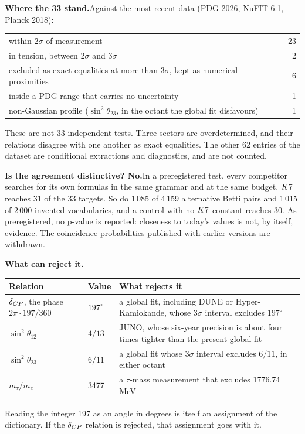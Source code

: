 \documentclass[10pt,a4paper]{article}
\begin{document}
{\noindent\textbf{Where the 33 stand.}\enspace Against the most recent
data (PDG 2026, NuFIT 6.1, Planck 2018):
\begin{center}
\begin{tabular}{@{}p{}r@{}}
\toprule
within $2\sigma$ of measurement & 23 \\
in tension, between $2\sigma$ and $3\sigma$ & 2 \\
excluded as exact equalities at more than $3\sigma$, kept as numerical proximities & 6 \\
inside a PDG range that carries no uncertainty & 1 \\
non-Gaussian profile ($\sin^2\theta_{23}$, in the octant the global fit disfavours) & 1 \\
\bottomrule
\end{tabular}
\end{center}
\noindent These are not 33 independent tests. Three sectors are
overdetermined, and their relations disagree with one another as exact
equalities. The other 62 entries of the dataset are conditional
extractions and diagnostics, and are not counted.

\vspace{0.2em}
\noindent\textbf{Is the agreement distinctive? No.}\enspace In a
preregistered test, every competitor searches for its own formulas in the
same grammar and at the same budget. $K7$ reaches 31 of the 33
targets. So do 1\,085 of 4\,159 alternative Betti pairs and 1\,015 of
2\,000 invented vocabularies, and a control with no $K7$ constant
reaches 30. As preregistered, no p-value is reported: closeness to today's
values is not, by itself, evidence. The coincidence probabilities
published with earlier versions are withdrawn.

\vspace{0.2em}
\noindent\textbf{What can reject it.}
\begin{center}
\begin{tabular}{@{}p{}lp{}@{}}
\toprule
\textbf{Relation} & \textbf{Value} & \textbf{What rejects it} \\
\midrule
$\delta_{CP}$, the phase $2\pi \cdot 197/360$ & $197^\circ$ & a global fit, including DUNE or Hyper-Kamiokande, whose $3\sigma$ interval excludes $197^\circ$ \\
$\sin^2\theta_{12}$ & $4/13$ & JUNO, whose six-year precision is about four times tighter than the present global fit \\
$\sin^2\theta_{23}$ & $6/11$ & a global fit whose $3\sigma$ interval excludes $6/11$, in either octant \\
$m_\tau/m_e$ & 3477 & a $\tau$-mass measurement that excludes 1776.74 MeV \\
\bottomrule
\end{tabular}
\end{center}
\noindent Reading the integer 197 as an angle in degrees is itself an
assignment of the dictionary. If the $\delta_{CP}$ relation is rejected,
that assignment goes with it.

}
\end{document}

